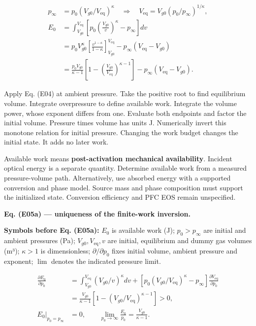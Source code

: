 \documentclass[11pt]{article}
\begin{document}
\begin{equation*}
\begin{aligned}
p_\infty&=p_0(V_{g0}/V_{\mathrm{eq}})^\kappa
\quad\Longrightarrow\quad V_{\mathrm{eq}}=V_{g0}(p_0/p_\infty)^{1/\kappa},\\
E_0&=\int_{V_{g0}}^{V_{\mathrm{eq}}}
\left[p_0\left(\frac{V_{g0}}v\right)^\kappa-p_\infty\right]dv\\
&=p_0V_{g0}^\kappa\left[\frac{v^{1-\kappa}}{1-\kappa}\right]_{V_{g0}}^{V_{\mathrm{eq}}}
-p_\infty(V_{\mathrm{eq}}-V_{g0})\\
&=\frac{p_0V_{g0}}{\kappa-1}
\left[1-\left(\frac{V_{g0}}{V_{\mathrm{eq}}}\right)^{\kappa-1}\right]
-p_\infty(V_{\mathrm{eq}}-V_{g0}).
\end{aligned}
\end{equation*}

Apply Eq. (E04) at ambient pressure. Take the positive root to find equilibrium volume. Integrate overpressure to define available work. Integrate the volume power, whose exponent differs from one. Evaluate both endpoints and factor the initial volume. Pressure times volume has units J. Numerically invert this monotone relation for initial pressure. Changing the work budget changes the initial state. It adds no later work.


Available work means \textbf{post-activation mechanical availability}. Incident optical energy is a separate quantity. Determine available work from a measured pressure-volume path. Alternatively, use absorbed energy with a supported conversion and phase model. Source mass and phase composition must support the initialized state. Conversion efficiency and PFC EOS remain unspecified.


\textbf{Eq. (E05a) — uniqueness of the finite-work inversion.}


\textbf{Symbols before Eq. (E05a):} \(E_0\) is available work (J); \(p_0>p_\infty\) are initial and ambient pressures (Pa); \(V_{g0},V_{\mathrm{eq}},v\) are initial, equilibrium and dummy gas volumes (m³); \(\kappa>1\) is dimensionless; \(\partial/\partial p_0\) fixes initial volume, ambient pressure and exponent; \(\lim\) denotes the indicated pressure limit.



\begin{equation*}
\begin{aligned}
\frac{\partial E_0}{\partial p_0}
&=\int_{V_{g0}}^{V_{\mathrm{eq}}}(V_{g0}/v)^\kappa dv
+[p_0(V_{g0}/V_{\mathrm{eq}})^\kappa-p_\infty]\frac{\partial V_{\mathrm{eq}}}{\partial p_0}\\
&=\frac{V_{g0}}{\kappa-1}[1-(V_{g0}/V_{\mathrm{eq}})^{\kappa-1}]>0,\\
E_0\big|_{p_0=p_\infty}&=0,\qquad \lim_{p_0\to\infty}\frac{E_0}{p_0}=\frac{V_{g0}}{\kappa-1}.
\end{aligned}
\end{equation*}
\end{document}
